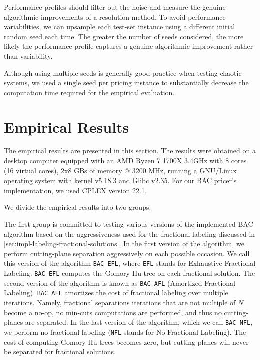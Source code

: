 Performance profiles should filter out the noise and measure the genuine algorithmic improvements of a resolution method.
To avoid performance variabilities, we can upsample each test-set instance using a different initial random seed each time.
The greater the number of seeds considered, the more likely the performance profile captures a genuine algorithmic improvement rather than variability.

Although using multiple seeds is generally good practice when testing chaotic systems, we used a single seed per pricing instance to substantially decrease the computation time required for the empirical evaluation.

\section{Empirical Results}
\label{sec:results-empirical-results}

The empirical results are presented in this section.
The results were obtained on a desktop computer equipped with
an AMD Ryzen 7 1700X 3.4GHz with 8 cores (16 virtual cores),
2x8 GBs of memory @ 3200 MHz,
running a GNU/Linux operating system with kernel v5.18.3 and Glibc v2.35.
For our BAC pricer's implementation, we used CPLEX version 22.1.

\medskip

We divide the empirical results into two groups.

\medskip

The first group is committed to testing various versions of the implemented BAC algorithm based on the aggressiveness used for the fractional labeling discussed in \cref{sec:impl-labeling-fractional-solutions}.
In the first version of the algorithm, we perform cutting-plane separation aggressively on each possible occasion.
We call this version of the algorithm \texttt{BAC EFL}, where \texttt{EFL} stands for Exhaustive Fractional Labeling.
\texttt{BAC EFL} computes the Gomory-Hu tree on each fractional solution.
The second version of the algorithm is known as \texttt{BAC AFL} (Amortized Fractional Labeling).
\texttt{BAC AFL} amortizes the cost of fractional labeling over multiple iterations.
Namely, fractional separations iterations that are not multiple of $N$ become a no-op, no min-cuts computations are performed, and thus no cutting-planes are separated.
In the last version of the algorithm, which we call \texttt{BAC NFL}, we perform no fractional labeling (\texttt{NFL} stands for No Fractional Labeling).
The cost of computing Gomory-Hu trees becomes zero, but cutting planes will never be separated for fractional solutions.

